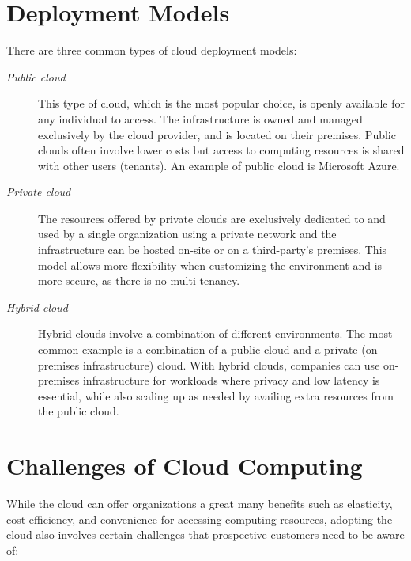 \section{Deployment Models}
There are three common types of cloud deployment models: \cite{nist,c2,PvsH}
\begin{description}
    \item [\textit{Public cloud}] This type of cloud, which is the most popular choice, is openly available for any individual to access. The infrastructure is owned and managed exclusively by the cloud provider, and is located on their premises. Public clouds often involve lower costs but access to computing resources is shared with other users (tenants). An example of public cloud is Microsoft Azure.

    \item [\textit{Private cloud}] The resources offered by private clouds are exclusively dedicated to and used by a single organization using a private network and the infrastructure can be hosted on-site or on a third-party's premises. This model allows more flexibility when customizing the environment and is more secure, as there is no multi-tenancy.

    \item [\textit{Hybrid cloud}] Hybrid clouds involve a combination of different environments. The most common example is a combination of a public cloud and a private (on premises infrastructure) cloud. With hybrid clouds, companies can use on-premises infrastructure for workloads where privacy and low latency is essential, while also scaling up as needed by availing extra resources from the public cloud.
\end{description}


\section{Challenges of Cloud Computing}
While the cloud can offer organizations a great many benefits such as elasticity, cost-efficiency, and convenience for accessing computing resources, adopting the cloud also involves certain challenges that prospective customers need to be aware of: \cite{c2,armbrust}

